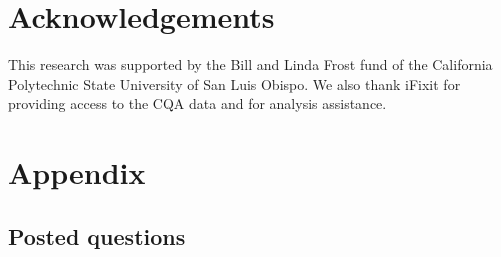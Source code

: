 \documentclass[preprint]{elsarticle}
\begin{document}

\section{Acknowledgements}

This research was supported by the Bill and Linda Frost fund of the California Polytechnic State University of San Luis Obispo. We also thank iFixit for providing access to the CQA data and for analysis assistance.


\section{Appendix} 

\subsection{Posted questions}

\end{document}
